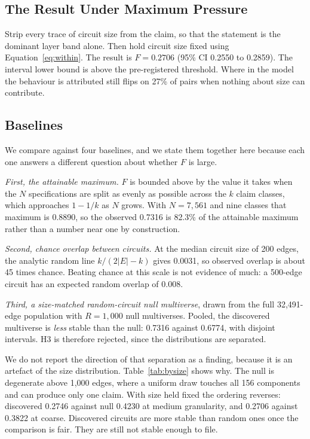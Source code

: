 \documentclass[letterpaper]{article} %
\begin{document}
\subsection{The Result Under Maximum Pressure}

Strip every trace of circuit size from the claim, so that the statement is the
dominant layer band alone. Then hold circuit size fixed using
Equation~\ref{eq:within}. The result is $F = 0.2706$ (95\% CI 0.2550 to 0.2859).
The interval lower bound is above the pre-registered threshold. Where in the
model the behaviour is attributed still flips on 27\% of pairs when nothing
about size can contribute.

\subsection{Baselines}

We compare against four baselines, and we state them together here because each
one answers a different question about whether $F$ is large.

\emph{First, the attainable maximum.} $F$ is bounded above by the value it takes
when the $N$ specifications are split as evenly as possible across the $k$ claim
classes, which approaches $1 - 1/k$ as $N$ grows. With $N = 7{,}561$ and nine
classes that maximum is 0.8890, so the observed 0.7316 is 82.3\% of the
attainable maximum rather than a number near one by construction.

\emph{Second, chance overlap between circuits.} At the median circuit size of
200 edges, the analytic random line $k/(2|E|-k)$ gives 0.0031, so observed
overlap is about 45 times chance. Beating chance at this scale is not evidence
of much: a 500-edge circuit has an expected random overlap of 0.008.

\emph{Third, a size-matched random-circuit null multiverse}, drawn from the full
32{,}491-edge population with $R = 1{,}000$ null multiverses. Pooled, the
discovered multiverse is \emph{less} stable than the null: 0.7316 against
0.6774, with disjoint intervals. H3 is therefore rejected, since the
distributions are separated.

We do not report the direction of that separation as a finding, because it is an
artefact of the size distribution. Table~\ref{tab:bysize} shows why. The null is
degenerate above 1{,}000 edges, where a uniform draw touches all 156 components
and can produce only one claim. With size held fixed the ordering reverses:
discovered 0.2746 against null 0.4230 at medium granularity, and 0.2706 against
0.3822 at coarse. Discovered circuits are more stable than random ones once the
comparison is fair. They are still not stable enough to file.
\end{document}
